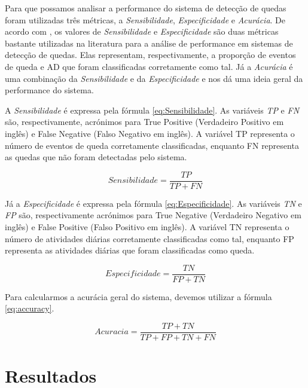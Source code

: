 Para que possamos analisar a performance do sistema de detecção de quedas foram utilizadas três métricas, a \textit{Sensibilidade},  \textit{Especificidade} e \textit{Acurácia}. De acordo com \cite{casilari2015automatic}, os valores de \textit{Sensibilidade} e \textit{Especificidade} são duas métricas bastante utilizadas na literatura para a análise de performance em sistemas de detecção de quedas. Elas representam, respectivamente, a proporção de eventos de queda e \ac{AD} que foram classificadas corretamente como tal. Já a \textit{Acurácia} é uma combinação da \textit{Sensibilidade} e da \textit{Especificidade} e nos dá uma ideia geral da performance do sistema.

A \textit{Sensibilidade} é expressa pela fórmula \ref{eq:Sensibilidade}. As variáveis \textit{TP} e \textit{FN} são, respectivamente, acrónimos para True Positive (Verdadeiro Positivo em inglês) e False Negative (Falso Negativo em inglês). A variável TP representa o número de eventos de queda corretamente classificadas, enquanto FN representa as quedas que não foram detectadas pelo sistema.

\begin{equation}
Sensibilidade = \frac{TP}{TP + FN}
\label{eq:Sensibilidade}
\end{equation}


Já a \textit{Especificidade} é expressa pela fórmula \ref{eq:Especificidade}. As variáveis \textit{TN} e \textit{FP} são, respectivamente acrónimos para True Negative (Verdadeiro Negativo em inglês) e False Positive (Falso Positivo em inglês). A variável TN representa o número de atividades diárias corretamente classificadas como tal, enquanto FP representa as atividades diárias que foram classificadas como queda.

\begin{equation}
Especificidade = \frac{TN}{FP + TN}
\label{eq:Especificidade}
\end{equation}

Para calcularmos a acurácia geral do sistema, devemos utilizar a fórmula \ref{eq:accuracy}. 

\begin{equation}
Acuracia = \frac{TP + TN}{TP + FP + TN + FN}
\label{eq:accuracy}
\end{equation}


\section{Resultados}
\label{sec:results}


